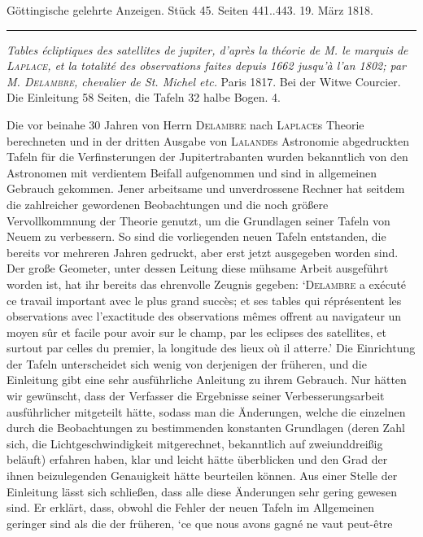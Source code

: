 \clearpage
{}
\hypertarget{native-608-lower}{}
\begin{center}\small Göttingische gelehrte Anzeigen. Stück 45. Seiten 441..443. 19. März 1818.\\[3pt]\rule{.72\linewidth}{.3pt}\end{center}

\emph{Tables écliptiques des satellites de jupiter, d'après la théorie de M. le marquis de \textup{\textsc{Laplace}}, et la totalité des observations faites depuis \textup{1662} jusqu'à l'an \textup{1802}; par M. \textup{\textsc{Delambre}}, chevalier de St. Michel etc.} Paris 1817. Bei der Witwe Courcier. Die Einleitung 58 Seiten, die Tafeln 32 halbe Bogen. 4.

\begingroup{}\relax
Die vor beinahe 30 Jahren von Herrn \textsc{Delambre} nach \textsc{Laplace}s Theorie berechneten und in der dritten Ausgabe von \textsc{Lalande}s Astronomie abgedruckten Tafeln für die Verfinsterungen der Jupitertrabanten wurden bekanntlich von den Astronomen mit verdientem Beifall aufgenommen und sind in allgemeinen Gebrauch gekommen. Jener arbeitsame und unverdrossene Rechner hat seitdem die zahlreicher gewordenen Beobachtungen und die noch größere Vervollkommnung der Theorie genutzt, um die Grundlagen seiner Tafeln von Neuem zu verbessern. So sind die vorliegenden neuen Tafeln entstanden, die bereits vor mehreren Jahren gedruckt, aber erst jetzt ausgegeben worden sind. Der große Geometer, unter dessen Leitung diese mühsame Arbeit ausgeführt worden ist, hat ihr bereits das ehrenvolle Zeugnis gegeben: `\textsc{Delambre} a exécuté ce travail important avec le plus grand succès; et ses tables qui réprésentent les observations avec l'exactitude des observations mêmes offrent au navigateur un moyen sûr et facile pour avoir sur le champ, par les eclipses des satellites, et surtout par celles du premier, la longitude des lieux où il atterre.' Die Einrichtung der Tafeln unterscheidet sich wenig von derjenigen der früheren, und die Einleitung gibt eine sehr ausführliche Anleitung zu ihrem Gebrauch. Nur hätten wir gewünscht, dass der Verfasser die Ergebnisse seiner Verbesserungsarbeit ausführlicher mitgeteilt hätte, sodass man die Änderungen, welche die einzelnen durch die Beobachtungen zu bestimmenden konstanten Grundlagen (deren Zahl sich, die Lichtgeschwindigkeit mitgerechnet, bekanntlich auf zweiunddreißig beläuft) erfahren haben, klar und leicht hätte überblicken und den Grad der ihnen beizulegenden Genauigkeit hätte beurteilen können. Aus einer Stelle der Einleitung lässt sich schließen, dass alle diese Änderungen sehr gering gewesen sind. Er erklärt, dass, obwohl die Fehler der neuen Tafeln im Allgemeinen geringer sind als die der früheren, `ce que nous avons gagné ne vaut peut-être
